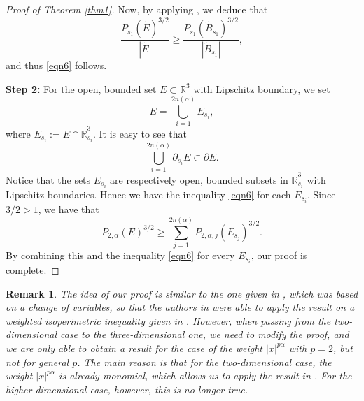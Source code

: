 \documentclass[10pt, reqno]{amsart}
\newtheorem{remark}{Remark}
\begin{document}
\begin{proof}[Proof of Theorem \ref{thm1}]
		Now, by applying \cite[Theorem 1.1]{Lions}, we deduce that
		$$ \dfrac{P_{s_1}(\widetilde{E})^{3/2}}{|\widetilde{E}|} \geq \dfrac{P_{s_1}(\widetilde{B}_{s_1})^{3/2}}{|\widetilde{B}_{s_1}|}, $$
		and thus \eqref{eqn6} follows. 
		
		\noindent \textbf{Step 2:} For the open, bounded set $E \subset \mathbb{R}^3$ with Lipschitz boundary, we set
		$$E = \bigcup_{i=1}^{2n(\alpha)} E_{s_i}, $$
		where $E_{s_i} := E \cap \overline{\mathbb{R}}^3_{s_i}$. It is easy to see that
		\begin{equation}\label{eqn7}
			\bigcup_{i=1}^{2n(\alpha)} \partial_{s_i} E \subset \partial E.
		\end{equation}
		Notice that the sets $E_{s_i}$ are respectively open, bounded subsets in $\overline{\mathbb{R}}^3_{s_i}$ with Lipschitz boundaries. Hence we have the inequality \eqref{eqn6} for each $E_{s_i}$. Since $3/2 > 1$, we have that
		$$ P_{2,\alpha} (E)^{3/2} \geq \sum\limits_{j=1}^{2n(\alpha)} P_{2,\alpha,j}( E_{s_j})^{3/2}.$$
		By combining this and the inequality \eqref{eqn6} for every $E_{s_i}$, our proof is complete. 
	\end{proof}
	
	\begin{remark}
		\label{rem1}
		The idea of our proof is similar to the one given in \cite{nga}, which was based on a change of variables, so that the authors in \cite{nga} were able to apply the result on a weighted isoperimetric inequality given in \cite{cab}. However, when passing from the two-dimensional case to the three-dimensional one, we need to modify the proof, and we are only able to obtain a result for the case of the weight $|x|^{p\alpha}$ with $p=2$, but not for general $p$. The main reason is that for the two-dimensional case, the weight $|x|^{p\alpha}$ is already monomial, which allows us to apply the result in \cite{cab}. For the higher-dimensional case, however, this is no longer true.
	\end{remark}
	
\end{document}
